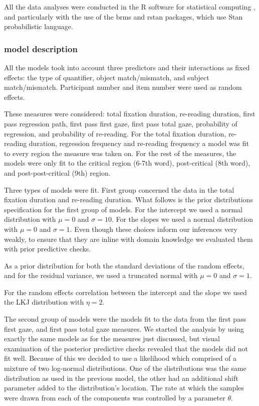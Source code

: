 All the data analyses were conducted in the R software for statistical
computing \autocite{Rcore}, and particularly with the use of the brms
\autocite{bürkner2017brms} and rstan \autocite{team2020rstan} packages,
which use Stan \autocite{stan2021} probabilistic language.

\hypertarget{model-description}{%
\subsubsection{model description}\label{model-description}}

All the models took into account three predictors and their interactions
as fixed effects: the type of quantifier, object match/mismatch, and
subject match/mismatch. Participant number and item number were used as
random effects.

These measures were considered: total fixation duration, re-reading
duration, first pass regression path, first pass first gaze, first pass
total gaze, probability of regression, and probability of re-reading.
For the total fixation duration, re-reading duration, regression
frequency and re-reading frequency a model was fit to every region the
measure was taken on. For the rest of the measures, the models were only
fit to the critical region (6-7th word), post-critical (8th word), and
post-post-critical (9th) region.

Three types of models were fit. First group concerned the data in the
total fixation duration and re-reading duration. What follows is the
prior distributions specification for the first group of models. For the
intercept we used a normal distribution with \(\mu = 0\) and
\(\sigma = 10\). For the slopes we used a normal distribution with
\(\mu = 0\) and \(\sigma = 1\). Even though these choices inform our
inferences very weakly, to ensure that they are inline with domain
knowledge we evaluated them with prior predictive checks.

As a prior distribution for both the standard deviations of the random
effects, and for the residual variance, we used a truncated normal with
\(\mu = 0\) and \(\sigma = 1\).

For the random effects correlation between the intercept and the slope
we used the LKJ distribution \autocite{lewandowski2009gener,stan2021}
with \(\eta = 2\).

The second group of models were the models fit to the data from the
first pass first gaze, and first pass total gaze measures. We started
the analysis by using exactly the same models as for the measures just
discussed, but visual examination of the posterior predictive checks
revealed that the models did not fit well. Because of this we decided to
use a likelihood which comprised of a mixture of two log-normal
distributions. One of the distributions was the same distribution as
used in the previous model, the other had an additional shift parameter
added to the distribution's location. The rate at which the samples were
drawn from each of the components was controlled by a parameter
\(\theta\).


